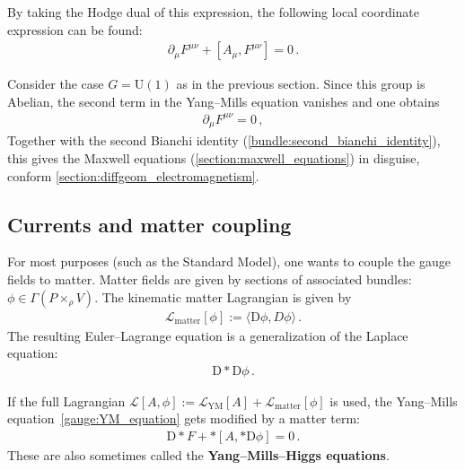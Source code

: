     By taking the Hodge dual of this expression, the following local coordinate expression can be found:
    \begin{gather}
        \partial_\mu F^{\mu\nu} + [A_\mu,F^{\mu\nu}] = 0\,.
    \end{gather}
    
    \begin{example}[QED]
        Consider the case $G=\mathrm{U}(1)$ as in the previous section. Since this group is Abelian, the second term in the Yang--Mills equation vanishes and one obtains
        \begin{gather}
            \partial_\mu F^{\mu\nu} = 0\,,
        \end{gather}
        Together with the second Bianchi identity (\cref{bundle:second_bianchi_identity}), this gives the Maxwell equations (\cref{section:maxwell_equations}) in disguise, conform \cref{section:diffgeom_electromagnetism}.
    \end{example}


\subsection{Currents and matter coupling}

    For most purposes (such as the Standard Model), one wants to couple the gauge fields to matter. Matter fields are given by sections of associated bundles: $\phi\in\Gamma(P\times_\rho V)$. The kinematic matter Lagrangian is given by
    \begin{gather}
        \mathcal{L}_{\text{matter}}[\phi] := \langle\mathrm{D}\phi,D\phi\rangle\,.
    \end{gather}
    The resulting Euler--Lagrange equation is a generalization of the Laplace equation:
    \begin{gather}
        \mathrm{D}\ast\mathrm{D}\phi\,.
    \end{gather}

    If the full Lagrangian $\mathcal{L}[A,\phi]:=\mathcal{L}_{\text{YM}}[A]+\mathcal{L}_{\text{matter}}[\phi]$ is used, the Yang--Mills equation~\eqref{gauge:YM_equation} gets modified by a matter term:
    \begin{gather}
        \mathrm{D}\ast F + \ast[A,\ast\mathrm{D}\phi]=0\,.
    \end{gather}
    These are also sometimes called the \textbf{Yang--Mills--Higgs equations}.

